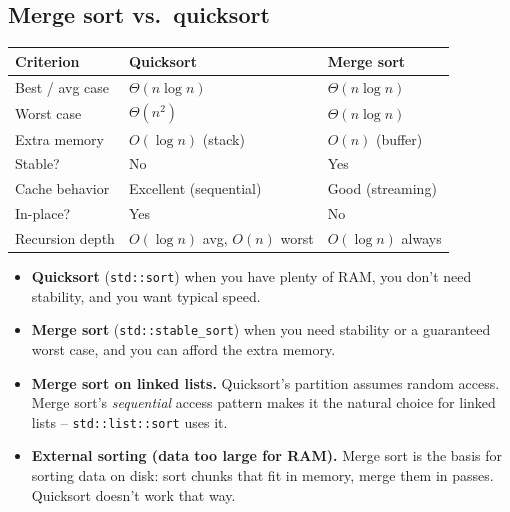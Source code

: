 \documentclass[11pt]{article}
\begin{document}
\subsection{Merge sort vs.\ quicksort}

\begin{center}
\footnotesize
\renewcommand{\arraystretch}{1.3}
\begin{tabular}{@{}lll@{}}
\hline
\textbf{Criterion}    & \textbf{Quicksort}          & \textbf{Merge sort} \\
\hline
Best / avg case       & $\Theta(n \log n)$          & $\Theta(n \log n)$ \\
Worst case            & $\Theta(n^2)$                & $\Theta(n \log n)$ \\
Extra memory          & $O(\log n)$ (stack)          & $O(n)$ (buffer) \\
Stable?               & No                           & Yes \\
Cache behavior        & Excellent (sequential)       & Good (streaming) \\
In-place?             & Yes                          & No \\
Recursion depth       & $O(\log n)$ avg, $O(n)$ worst & $O(\log n)$ always \\
\hline
\end{tabular}
\end{center}

\begin{ideabox}
\begin{itemize}[leftmargin=*]
  \item \textbf{Quicksort} (\texttt{std::sort}) when you have plenty
        of RAM, you don't need stability, and you want typical
        speed.
  \item \textbf{Merge sort} (\texttt{std::stable\_sort}) when you
        need stability or a guaranteed worst case, and you can
        afford the extra memory.
  \item \textbf{Merge sort on linked lists.} Quicksort's partition
        assumes random access. Merge sort's \emph{sequential} access
        pattern makes it the natural choice for linked lists --
        \texttt{std::list::sort} uses it.
  \item \textbf{External sorting (data too large for RAM).} Merge
        sort is the basis for sorting data on disk: sort chunks that
        fit in memory, merge them in passes. Quicksort doesn't
        work that way.
\end{itemize}
\end{ideabox}
\end{document}
